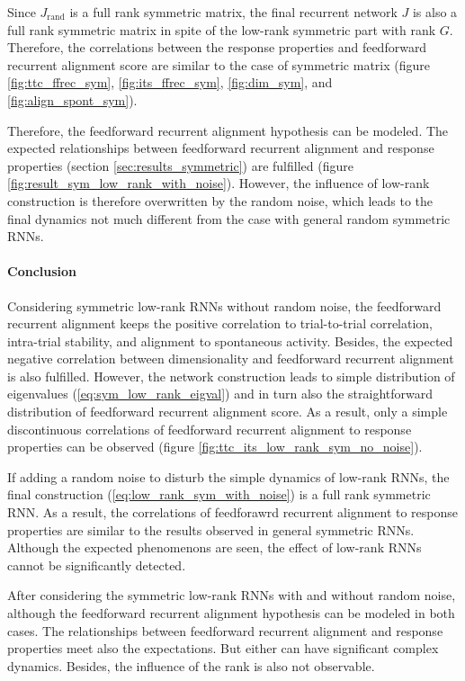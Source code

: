 \documentclass[11pt]{article}
\begin{document}
	Since $J_{\text{rand}}$ is a full rank symmetric matrix, the final recurrent network $J$ is also a full rank symmetric matrix in spite of the low-rank symmetric part with rank $G$. Therefore, the correlations between the response properties and feedforward recurrent alignment score are similar to the case of symmetric matrix (figure \ref{fig:ttc_ffrec_sym}, \ref{fig:its_ffrec_sym}, \ref{fig:dim_sym}, and \ref{fig:align_spont_sym}). 
	
	Therefore, the feedforward recurrent alignment hypothesis can be modeled. The expected relationships between feedforward recurrent alignment and response properties (section \ref{sec:results_symmetric}) are fulfilled (figure \ref{fig:result_sym_low_rank_with_noise}). However, the influence of low-rank construction is therefore overwritten by the random noise, which leads to the final dynamics not much different from the case with general random symmetric RNNs. 
	
	\paragraph{Conclusion}
	
	Considering symmetric low-rank RNNs without random noise, the feedforward recurrent alignment keeps the positive correlation to trial-to-trial correlation, intra-trial stability, and alignment to spontaneous activity. Besides, the expected negative correlation between dimensionality and feedforward recurrent alignment is also fulfilled. However, the network construction leads to simple distribution of eigenvalues (\ref{eq:sym_low_rank_eigval}) and in turn also the straightforward distribution of feedforward recurrent alignment score. As a result, only a simple discontinuous correlations of feedforward recurrent alignment to response properties can be observed (figure \ref{fig:ttc_its_low_rank_sym_no_noise}). 
	
	If adding a random noise to disturb the simple dynamics of low-rank RNNs, the final construction (\ref{eq:low_rank_sym_with_noise}) is a full rank symmetric RNN. As a result, the correlations of feedforawrd recurrent alignment to response properties are similar to the results observed in general symmetric RNNs. Although the expected phenomenons are seen, the effect of low-rank RNNs cannot be significantly detected. 
	
	After considering the symmetric low-rank RNNs with and without random noise, although the feedforward recurrent alignment hypothesis can be modeled in both cases. The relationships between feedforward recurrent alignment and response properties meet also the expectations. But either can have significant complex dynamics. Besides, the influence of the rank is also not observable. 
	
\end{document}
